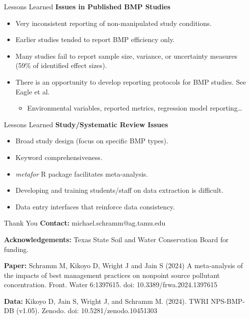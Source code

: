 \documentclass[
  ignorenonframetext,
  aspectratio=169,
]{beamer}
\newif\ifbibliography
\providecommand{\tightlist}{%
  \setlength{\itemsep}{0pt}\setlength{\parskip}{0pt}}\usepackage{longtable,booktabs,array}
\begin{document}
\begin{frame}{Lessons Learned}
\label{lessons-learned}
\textbf{Issues in Published BMP Studies}

\begin{itemize}
\tightlist
\item
  Very inconsistent reporting of non-manipulated study conditions.
\item
  Earlier studies tended to report BMP efficiency only.
\item
  Many studies fail to report sample size, variance, or uncertainty
  measures (59\% of identified effect sizes).
\item
  There is an opportunity to develop reporting protocols for BMP
  studies. See Eagle et
  al.~

  \begin{itemize}
  \tightlist
  \item
    Environmental variables, reported metrics, regression model
    reporting\ldots{}
  \end{itemize}
\end{itemize}
\end{frame}

\begin{frame}{Lessons Learned}
\label{lessons-learned-1}
\textbf{Study/Systematic Review Issues}

\begin{itemize}
\tightlist
\item
  Broad study design (focus on specific BMP types).
\item
  Keyword comprehensiveness.
\item
  \emph{metafor} R package facilitates
  meta-analysis.
\item
  Developing and training students/staff on data extraction is
  difficult.
\item
  Data entry interfaces that reinforce data consistency.
\end{itemize}
\end{frame}

\begin{frame}{Thank You}
\label{thank-you}
\textbf{Contact:} michael.schramm@ag.tamu.edu

\textbf{Acknowledgements:} Texas State Soil and Water Conservation Board
for funding.

\textbf{Paper:} Schramm M, Kikoyo D, Wright J and Jain S (2024) A
meta-analysis of the impacts of best management practices on nonpoint
source pollutant concentration. Front. Water 6:1397615. doi:
10.3389/frwa.2024.1397615

\textbf{Data:} Kikoyo D, Jain S, Wright J, and Schramm M. (2024). TWRI
NPS-BMP-DB (v1.05). Zenodo. doi: 10.5281/zenodo.10451303
\end{frame}


\end{document}
